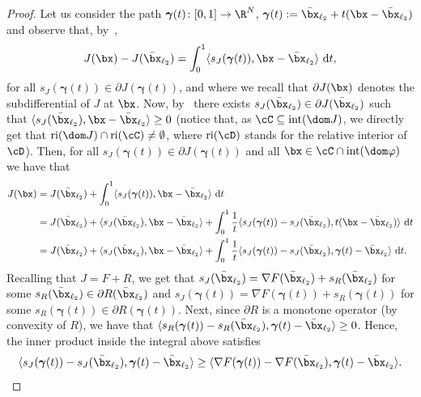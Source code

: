 \documentclass[11pt]{amsart}
\begin{document}
\begin{proof} Let us consider the path $\boldsymbol{\gamma}(t)\colon[0,1]\to\R^N$, $\boldsymbol{\gamma}(t):=\bar\bx_{\ell_2}+t(\bx-\bar\bx_{\ell_2})$ and observe that, by~\cite[Section D, Theorem 2.3.4]{HUL2001},
$$
J(\bx)-J(\bar\bx_{\ell_2})= \int_0^1 \langle  s_J(\boldsymbol{\gamma}(t)),\bx-\bar\bx_{\ell_2}\rangle \ \mathrm{d}t,
$$
for all $s_J(\boldsymbol{\gamma}(t))\in\partial J(\boldsymbol{\gamma}(t))$, and where we recall that $\partial J(\bx)$ denotes the subdifferential of $J$ at $\bx$. Now, by~\cite[Theorem 27.4]{Rock1970} there exists $s_J(\bar\bx_{\ell_2})\in\partial J(\bar\bx_{\ell_2})$ such that $\langle s_J(\bar\bx_{\ell_2}), \bx-\bar\bx_{\ell_2}\rangle\geq 0$ (notice that, as $\cC\subseteq\mathrm{int}(\dom J)$, we directly get that $\mathrm{ri}(\dom J)\cap \mathrm{ri}(\cC)\neq\emptyset$, where $\mathrm{ri}(\cD)$ stands for the relative interior of $\cD$). Then, for all $s_J(\boldsymbol{\gamma}(t))\in\partial J(\boldsymbol{\gamma}(t))$ and all $\bx\in\cC \cap \mathrm{int}(\dom \varphi)$ we have that
$$
\begin{aligned}
J(\bx)&= J(\bar\bx_{\ell_2})+\int_0^1 \langle  s_J(\boldsymbol{\gamma}(t)),\bx-\bar\bx_{\ell_2}\rangle \ \mathrm{d}t\\
&= J(\bar\bx_{\ell_2})+\langle s_J(\bar\bx_{\ell_2}), \bx-\bar\bx_{\ell_2}\rangle+\int_0^1 \frac{1}{t}\langle s_J(\boldsymbol{\gamma}(t))-s_J(\bar\bx_{\ell_2}),t(\bx-\bar\bx_{\ell_2})\rangle \ \mathrm{d}t\\
&= J(\bar\bx_{\ell_2})+\langle s_J(\bar\bx_{\ell_2}), \bx-\bar\bx_{\ell_2}\rangle+\int_0^1 \frac{1}{t}\langle s_J(\boldsymbol{\gamma}(t))-s_J(\bar\bx_{\ell_2}),\boldsymbol{\gamma}(t)-\bar\bx_{\ell_2}\rangle \ \mathrm{d}t.
\end{aligned}
$$
Recalling that $J=F+R$, we get that $s_J(\bar\bx_{\ell_2})=\nabla F(\bar\bx_{\ell_2})+s_R(\bar\bx_{\ell_2})$ for some $s_R(\bar\bx_{\ell_2})\in\partial R(\bar\bx_{\ell_2})$ and $s_J(\boldsymbol{\gamma}(t))=\nabla F(\boldsymbol{\gamma}(t))+s_R(\boldsymbol{\gamma}(t))$ for some $s_R(\boldsymbol{\gamma}(t))\in\partial R(\boldsymbol{\gamma}(t))$. Next, since $\partial R$ is a monotone operator (by convexity of $R$), we have that $\langle s_R(\boldsymbol{\gamma}(t)) -  s_R(\bar\bx_{\ell_2}), \boldsymbol{\gamma}(t) - \bar\bx_{\ell_2}\rangle\geq 0$. Hence, the inner product inside the integral above satisfies
$$
\langle s_J(\boldsymbol{\gamma}(t))-s_J(\bar\bx_{\ell_2}),\boldsymbol{\gamma}(t)-\bar\bx_{\ell_2}\rangle\geq \langle \nabla F(\boldsymbol{\gamma}(t))-\nabla F(\bar\bx_{\ell_2}),\boldsymbol{\gamma}(t)-\bar\bx_{\ell_2}\rangle.
$$
\end{proof}
\end{document}
